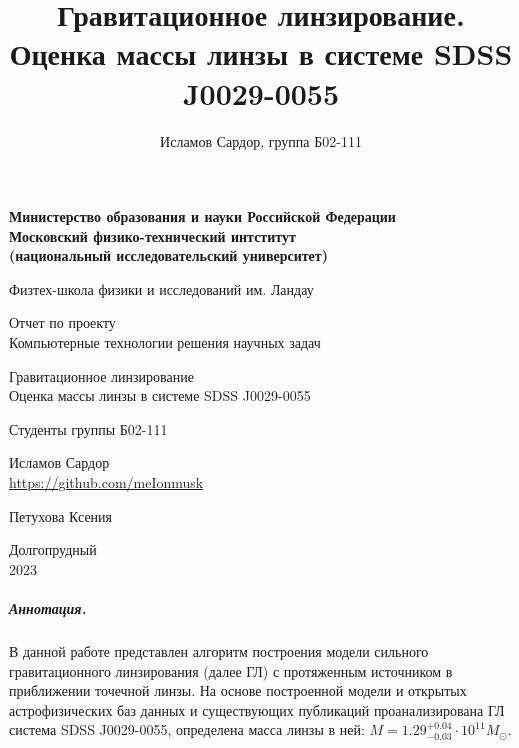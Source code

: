 \documentclass[12pt,a4paper]{article}
\title{Гравитационное линзирование.\\
Оценка массы линзы в системе SDSS J0029-0055}
\author{Исламов Сардор, группа Б02-111}
\begin{document}
\begin{titlepage}
    \centering
        {\bfseries 
        Министерство образования и науки Российской Федерации \\
        Московский физико-технический интститут \\
        (национальный исследовательский университет)}
        \vspace{3em}

        Физтех-школа физики и исследований им. Ландау
        \vspace{3em}         
    
        Отчет по проекту\\
        Компьютерные технологии решения научных задач
        \vspace{7em}
    
        \Large Гравитационное линзирование\\
        Оценка массы линзы в системе SDSS J0029-0055
    
        \vspace{5em}
    
        
        \small
        \begin{flushright}
            Студенты группы Б02-111\\
            \vspace{1em}

            Исламов Сардор\\
            \url{https://github.com/meIonmusk} \\
            \vspace{1em}

            Петухова Ксения
        \end{flushright}

        \vspace{20em}
        Долгопрудный\\ 2023
\end{titlepage}

\subparagraph*{Аннотация.} В данной работе представлен алгоритм построения модели сильного гравитационного линзирования (далее ГЛ) с протяженным источником в приближении точечной линзы. 
На основе построенной модели и открытых астрофизических баз данных и существующих публикаций проанализирована ГЛ система SDSS J0029-0055, определена масса линзы в ней: $M = 1.29^{+0.04}_{-0.03} \cdot 10^{11} M_\odot$.
\end{document}
